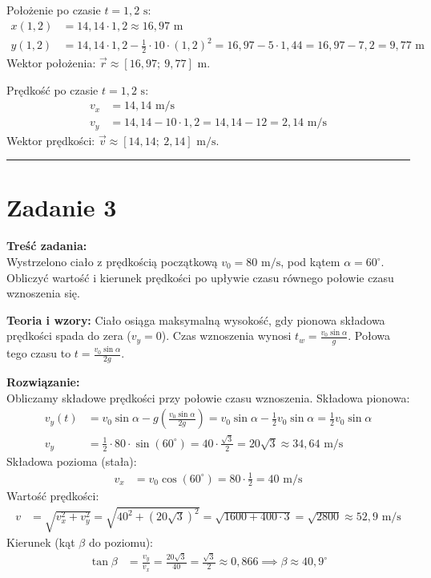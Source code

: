\documentclass[11pt, a4paper]{article}
\begin{document}
Położenie po czasie $t = 1,2 \text{ s}$:
\begin{align*}
    x(1,2) &= 14,14 \cdot 1,2 \approx 16,97 \text{ m} \\
    y(1,2) &= 14,14 \cdot 1,2 - \frac{1}{2} \cdot 10 \cdot (1,2)^2 = 16,97 - 5 \cdot 1,44 = 16,97 - 7,2 = 9,77 \text{ m}
\end{align*}
Wektor położenia: $\vec{r} \approx [16,97; \ 9,77] \text{ m}$.

Prędkość po czasie $t = 1,2 \text{ s}$:
\begin{align*}
    v_x &= 14,14 \text{ m/s} \\
    v_y &= 14,14 - 10 \cdot 1,2 = 14,14 - 12 = 2,14 \text{ m/s}
\end{align*}
Wektor prędkości: $\vec{v} \approx [14,14; \ 2,14] \text{ m/s}$.

\vspace{0.5cm}
\hrule
\vspace{0.5cm}

\section*{Zadanie 3}

\textbf{Treść zadania:} \\
Wystrzelono ciało z prędkością początkową $v_{0}=80 \text{ m/s}$, pod kątem $\alpha=60^\circ$. Obliczyć wartość i kierunek prędkości po upływie czasu równego połowie czasu wznoszenia się.

\textbf{Teoria i wzory:}
Ciało osiąga maksymalną wysokość, gdy pionowa składowa prędkości spada do zera ($v_y = 0$).
Czas wznoszenia wynosi $t_w = \frac{v_0 \sin\alpha}{g}$. Połowa tego czasu to $t = \frac{v_0 \sin\alpha}{2g}$.

\textbf{Rozwiązanie:} \\
Obliczamy składowe prędkości przy połowie czasu wznoszenia.
Składowa pionowa:
\begin{align*}
    v_y(t) &= v_0 \sin\alpha - g \left(\frac{v_0 \sin\alpha}{2g}\right) = v_0 \sin\alpha - \frac{1}{2}v_0 \sin\alpha = \frac{1}{2}v_0 \sin\alpha \\
    v_y &= \frac{1}{2} \cdot 80 \cdot \sin(60^\circ) = 40 \cdot \frac{\sqrt{3}}{2} = 20\sqrt{3} \approx 34,64 \text{ m/s}
\end{align*}
Składowa pozioma (stała):
\begin{align*}
    v_x &= v_0 \cos(60^\circ) = 80 \cdot \frac{1}{2} = 40 \text{ m/s}
\end{align*}
Wartość prędkości:
\begin{align*}
    v &= \sqrt{v_x^2 + v_y^2} = \sqrt{40^2 + (20\sqrt{3})^2} = \sqrt{1600 + 400 \cdot 3} = \sqrt{2800} \approx 52,9 \text{ m/s}
\end{align*}
Kierunek (kąt $\beta$ do poziomu):
\begin{align*}
    \tan\beta &= \frac{v_y}{v_x} = \frac{20\sqrt{3}}{40} = \frac{\sqrt{3}}{2} \approx 0,866 \implies \beta \approx 40,9^\circ
\end{align*}
\end{document}
